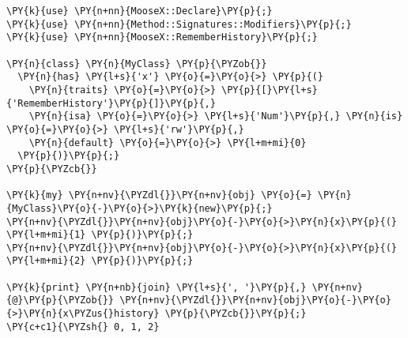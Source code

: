 \begin{Verbatim}[commandchars=\\\{\}]
\PY{k}{use} \PY{n+nn}{MooseX::Declare}\PY{p}{;}
\PY{k}{use} \PY{n+nn}{Method::Signatures::Modifiers}\PY{p}{;}
\PY{k}{use} \PY{n+nn}{MooseX::RememberHistory}\PY{p}{;}

\PY{n}{class} \PY{n}{MyClass} \PY{p}{\PYZob{}}
  \PY{n}{has} \PY{l+s}{'x'} \PY{o}{=}\PY{o}{>} \PY{p}{(} 
    \PY{n}{traits} \PY{o}{=}\PY{o}{>} \PY{p}{[}\PY{l+s}{'RememberHistory'}\PY{p}{]}\PY{p}{,} 
    \PY{n}{isa} \PY{o}{=}\PY{o}{>} \PY{l+s}{'Num'}\PY{p}{,} \PY{n}{is} \PY{o}{=}\PY{o}{>} \PY{l+s}{'rw'}\PY{p}{,}
    \PY{n}{default} \PY{o}{=}\PY{o}{>} \PY{l+m+mi}{0}
  \PY{p}{)}\PY{p}{;}
\PY{p}{\PYZcb{}}

\PY{k}{my} \PY{n+nv}{\PYZdl{}}\PY{n+nv}{obj} \PY{o}{=} \PY{n}{MyClass}\PY{o}{-}\PY{o}{>}\PY{k}{new}\PY{p}{;}
\PY{n+nv}{\PYZdl{}}\PY{n+nv}{obj}\PY{o}{-}\PY{o}{>}\PY{n}{x}\PY{p}{(} \PY{l+m+mi}{1} \PY{p}{)}\PY{p}{;}
\PY{n+nv}{\PYZdl{}}\PY{n+nv}{obj}\PY{o}{-}\PY{o}{>}\PY{n}{x}\PY{p}{(} \PY{l+m+mi}{2} \PY{p}{)}\PY{p}{;}

\PY{k}{print} \PY{n+nb}{join} \PY{l+s}{', '}\PY{p}{,} \PY{n+nv}{@}\PY{p}{\PYZob{}} \PY{n+nv}{\PYZdl{}}\PY{n+nv}{obj}\PY{o}{-}\PY{o}{>}\PY{n}{x\PYZus{}history} \PY{p}{\PYZcb{}}\PY{p}{;}
\PY{c+c1}{\PYZsh{} 0, 1, 2}
\end{Verbatim}

